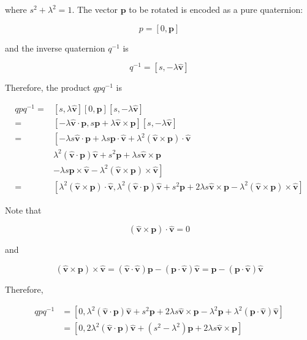 where $s^{2}+\lambda^{2}=1$. The vector $\mathbf{p}$ to be rotated is encoded as a pure quaternion:

$$
p=[0, \mathbf{p}]
$$

and the inverse quaternion $q^{-1}$ is

$$
q^{-1}=[s,-\lambda \hat{\mathbf{v}}]
$$

Therefore, the product $q p q^{-1}$ is

$$
\begin{aligned}
q p q^{-1}= & {[s, \lambda \hat{\mathbf{v}}][0, \mathbf{p}][s,-\lambda \hat{\mathbf{v}}] } \\
= & {[-\lambda \hat{\mathbf{v}} \cdot \mathbf{p}, s \mathbf{p}+\lambda \hat{\mathbf{v}} \times \mathbf{p}][s,-\lambda \hat{\mathbf{v}}] } \\
= & {\left[-\lambda s \hat{\mathbf{v}} \cdot \mathbf{p}+\lambda s \mathbf{p} \cdot \hat{\mathbf{v}}+\lambda^{2}(\hat{\mathbf{v}} \times \mathbf{p}) \cdot \hat{\mathbf{v}}\right.} \\
& \lambda^{2}(\hat{\mathbf{v}} \cdot \mathbf{p}) \hat{\mathbf{v}}+s^{2} \mathbf{p}+\lambda s \hat{\mathbf{v}} \times \mathbf{p} \\
& \left.-\lambda s \mathbf{p} \times \hat{\mathbf{v}}-\lambda^{2}(\hat{\mathbf{v}} \times \mathbf{p}) \times \hat{\mathbf{v}}\right] \\
= & {\left[\lambda^{2}(\hat{\mathbf{v}} \times \mathbf{p}) \cdot \hat{\mathbf{v}}, \lambda^{2}(\hat{\mathbf{v}} \cdot \mathbf{p}) \hat{\mathbf{v}}+s^{2} \mathbf{p}+2 \lambda s \hat{\mathbf{v}} \times \mathbf{p}-\lambda^{2}(\hat{\mathbf{v}} \times \mathbf{p}) \times \hat{\mathbf{v}}\right] }
\end{aligned}
$$

Note that

$$
(\hat{\mathbf{v}} \times \mathbf{p}) \cdot \hat{\mathbf{v}}=0
$$

and

$$
(\hat{\mathbf{v}} \times \mathbf{p}) \times \hat{\mathbf{v}}=(\hat{\mathbf{v}} \cdot \hat{\mathbf{v}}) \mathbf{p}-(\mathbf{p} \cdot \hat{\mathbf{v}}) \hat{\mathbf{v}}=\mathbf{p}-(\mathbf{p} \cdot \hat{\mathbf{v}}) \hat{\mathbf{v}}
$$

Therefore,

$$
\begin{aligned}
q p q^{-1} & =\left[0, \lambda^{2}(\hat{\mathbf{v}} \cdot \mathbf{p}) \hat{\mathbf{v}}+s^{2} \mathbf{p}+2 \lambda s \hat{\mathbf{v}} \times \mathbf{p}-\lambda^{2} \mathbf{p}+\lambda^{2}(\mathbf{p} \cdot \hat{\mathbf{v}}) \hat{\mathbf{v}}\right] \\
& =\left[0,2 \lambda^{2}(\hat{\mathbf{v}} \cdot \mathbf{p}) \hat{\mathbf{v}}+\left(s^{2}-\lambda^{2}\right) \mathbf{p}+2 \lambda s \hat{\mathbf{v}} \times \mathbf{p}\right]
\end{aligned}
$$

